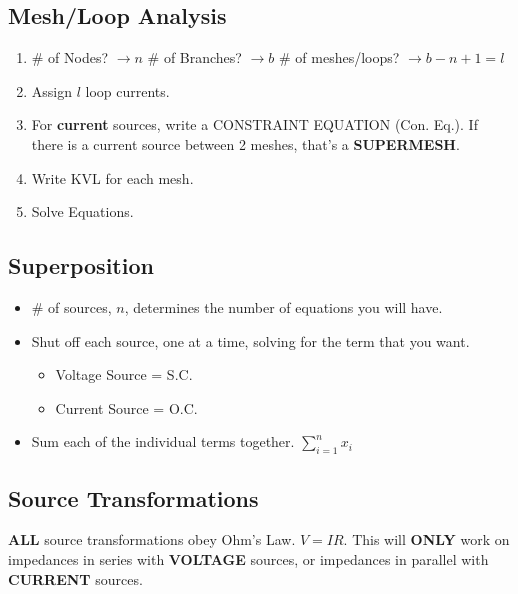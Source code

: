 \documentclass[10pt,letterpaper,final,twoside,notitlepage]{article}
\begin{document}
	\subsection*{Mesh/Loop Analysis} \label{subsec:Mesh Analysis}
		\begin{enumerate}
			\item \# of Nodes? $\rightarrow n$ \# of Branches? $\rightarrow b$ \# of meshes/loops? $\rightarrow b-n+1 = l$
			\item Assign $l$ loop currents.
			\item For \textbf{current} sources, write a CONSTRAINT EQUATION (Con. Eq.). If there is a current source between 2 meshes, that's a \textbf{SUPERMESH}.
			\item Write KVL for each mesh.
			\item Solve Equations.
		\end{enumerate}
	\subsection*{Superposition} \label{subsec:Superposition}
		\begin{itemize}[noitemsep, nolistsep]
			\item \# of sources, $n$, determines the number of equations you will have.
			\item Shut off each source, one at a time, solving for the term that you want.
			\begin{itemize}[noitemsep, nolistsep]
				\item Voltage Source = S.C.
				\item Current Source = O.C.
			\end{itemize}
			\item Sum each of the individual terms together. $\sum_{i=1}^{n} x_{i}$
		\end{itemize}

	\subsection*{Source Transformations} \label{sec:Source Transforms}
		\textbf{ALL} source transformations obey Ohm's Law. $V=IR$.
		This will \textbf{ONLY} work on impedances in series with \textbf{VOLTAGE} sources, or impedances in parallel with \textbf{CURRENT} sources.
\end{document}
